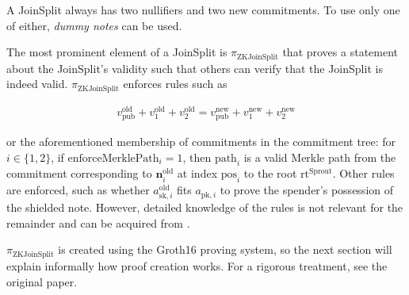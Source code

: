 \documentclass{article}
\begin{document}
A JoinSplit always has two nullifiers and two new commitments.
To use only one of either, \textit{dummy notes} can be used.

The most prominent element of a JoinSplit is $\pi_\text{ZKJoinSplit}$ that proves a statement about the JoinSplit's validity such that others can verify that the JoinSplit is indeed valid.
$\pi_\text{ZKJoinSplit}$ enforces rules such as

\begin{align}v_\text{pub}^\text{old} + v_1^\text{old} + v_2^\text{old} = v_\text{pub}^\text{new} + v_1^\text{new} + v_2^\text{new} \label{eq:balance}\end{align}

or the aforementioned membership of commitments in the commitment tree: for $i \in \{1,2\}$, if $\text{enforceMerklePath}_i = 1$, then $\text{path}_i$ is a valid Merkle path from the commitment corresponding to $\boldsymbol{n}_i^\text{old}$ at index $\text{pos}_i$ to the root $\text{rt}^\text{Sprout}$.
Other rules are enforced, such as whether $a^\text{old}_{\text{sk},i}$ fits $a_{\text{pk},i}$ to prove the spender's possession of the shielded note. However, detailed knowledge of the rules is not relevant for the remainder and can be acquired from \cite{hopwood:zcash}.

$\pi_\text{ZKJoinSplit}$ is created using the Groth16 \cite{groth:zksnark} proving system, so the next section will explain informally how proof creation works.
For a rigorous treatment, see the original paper.
\end{document}
